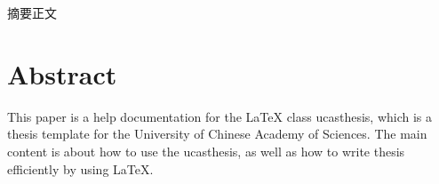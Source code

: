 摘要正文


\chapter*{Abstract}

This paper is a help documentation for the \LaTeX{} class ucasthesis, which is  a thesis template for the University of Chinese Academy of Sciences. The main content is about how to use the ucasthesis, as well as how to write thesis efficiently by using \LaTeX{}.

